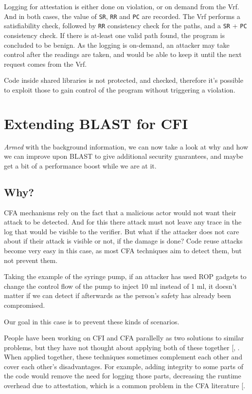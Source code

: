 \documentclass[a4paper, nobind]{templates/ociamthesis}
\begin{document}
Logging for attestation is either done on violation, or on demand from the Vrf. And in both cases,
the value of \texttt{SR}, \texttt{RR} and \texttt{PC} are recorded. The Vrf performs a satisfiability check,
followed by \texttt{RR} consistency check for the paths, and a \texttt{SR} + \texttt{PC} consistency check.
If there is at-least one valid path found, the program is concluded to be benign.
As the logging is on-demand, an attacker may take control after the readings are taken,
and would be able to keep it until the next request comes from the Vrf.

Code inside shared libraries is not protected, and checked, therefore it's possible to
exploit those to gain control of the program without triggering a violation.

\chapter{Extending BLAST for CFI}\label{extending-blast-for-cfi}

\minitoc 

\emph{Armed} with the background information, we can now take a look at why and how we can improve
upon BLAST to give additional security guarantees, and maybe get a bit of a performance boost
while we are at it.

\section{Why?}\label{why-1}

CFA mechanisms rely on the fact that a malicious actor would not want their attack
to be detected. And for this there attack must not leave any trace in the log that
would be visible to the verifier. But what if the attacker does not care about if
their attack is visible or not, if the damage is done? Code reuse attacks become
very easy in this case, as most CFA techniques aim to detect them, but not prevent them.

Taking the example of the syringe pump, if an attacker has used ROP gadgets to
change the control flow of the pump to inject 10 ml instead of 1 ml, it doesn't
matter if we can detect if afterwards as the person's safety has already been compromised.

Our goal in this case is to prevent these kinds of scenarios.

People have been working on CFI and CFA parallelly as two solutions to similar
problems, but they have not thought about applying both of these together {[}, \citeproc{ref-sok}{5}{]}.
When applied together, these techniques sometimes complement each other and cover
each other's disadvantages. For example, adding integrity to some parts of the
code would remove the need for logging those parts, decreasing the runtime overhead
due to attestation, which is a common problem in the CFA literature {[}\citeproc{ref-sok}{5}{]}.
\end{document}
